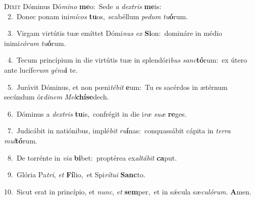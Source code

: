 \lettrine{\initial\textcolor{\initialcolor}{D}}{ixit} Dóminus Dó\-\textit{mi}\-\textit{no} \textbf{me}\-o:~\star Sede \textit{a} \textit{dex}\-\textit{tris} \textbf{me}\-is:\\
{\numbfont\textcolor{\numbcolor}{~2.}}~Donec ponam ini\-\textit{mí}\-\textit{cos} \textbf{tu}\-os,~\star scabéllum \textit{pe}\-\textit{dum} \textit{tu}\-\textbf{ó}rum.\par
{\numbfont\textcolor{\numbcolor}{~3.}}~Virgam virtútis tuæ emíttet Dómi\textit{nus} \textit{ex} \textbf{Si}\-on:~\star domináre in médio inimi\-\textit{có}\-\textit{rum} \textit{tu}\-\textbf{ó}rum.\par
{\numbfont\textcolor{\numbcolor}{~4.}}~Tecum princípium in die virtútis tuæ in splendóri\textit{bus} \textit{sanc}\-\textbf{tó}rum:~\star ex útero ante lucífe\textit{rum} \textit{gé}\-\textit{nu}\textbf{i} te.\par
{\numbfont\textcolor{\numbcolor}{~5.}}~Jurávit Dóminus, et non pœni\-\textit{té}\-\textit{bit} \textbf{e}\-um:~\star Tu es sacérdos in ætérnum secúndum ór\-\textit{di}\-\textit{nem} \textit{Mel}\-\textbf{chí}\textbf{se}dech.\par
{\numbfont\textcolor{\numbcolor}{~6.}}~Dóminus a \textit{dex}\-\textit{tris} \textbf{tu}\-is,~\star confrégit in die i\textit{ræ} \textit{su}\-\textit{æ} \textbf{re}\-ges.\par
{\numbfont\textcolor{\numbcolor}{~7.}}~Judicábit in natiónibus, implé\textit{bit} \textit{ru}\-\textbf{í}nas:~\star conquassábit cápita in \textit{ter}\-\textit{ra} \textit{mul}\-\textbf{tó}rum.\par
{\numbfont\textcolor{\numbcolor}{~8.}}~De torrénte in \textit{vi}\-\textit{a} \textbf{bi}\-bet:~\star proptérea ex\-\textit{al}\-\textit{tá}\textit{bit} \textbf{ca}\-put.\par
{\numbfont\textcolor{\numbcolor}{~9.}}~Glória Pa\-\textit{tri}\-, \textit{et} \textbf{Fí}\-lio,~\star et Spi\-\textit{rí}\-\textit{tu}\textit{i} \textbf{Sanc}\-to.\par
{\numbfont\textcolor{\numbcolor}{10.}}~Sicut erat in princípio, et \textit{nunc}\-, \textit{et} \textbf{sem}\-per,~\star et in sǽcula sæ\-\textit{cu}\-\textit{ló}\textit{rum}. \textbf{A}\-men.\par
